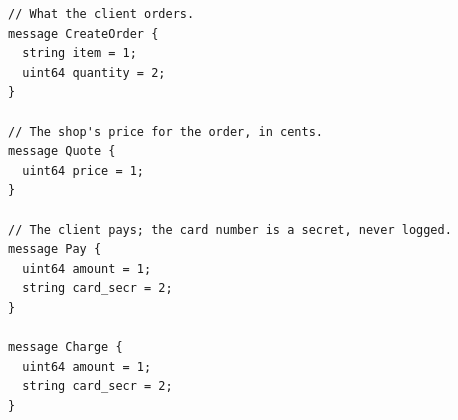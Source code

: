\begin{lstlisting}[language={},basicstyle=\ttfamily\footnotesize,breaklines=true]
// What the client orders.
message CreateOrder {
  string item = 1;
  uint64 quantity = 2;
}

// The shop's price for the order, in cents.
message Quote {
  uint64 price = 1;
}

// The client pays; the card number is a secret, never logged.
message Pay {
  uint64 amount = 1;
  string card_secr = 2;
}

message Charge {
  uint64 amount = 1;
  string card_secr = 2;
}
\end{lstlisting}
